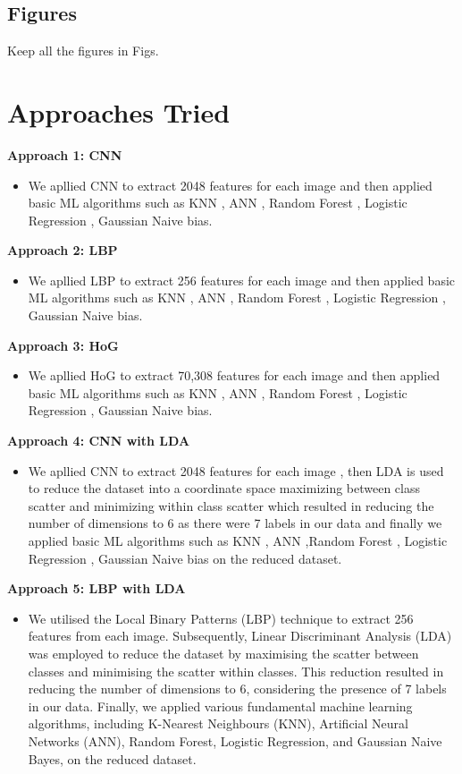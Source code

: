 \documentclass[a4paper]{article}
\theoremstyle{plain}
\theoremstyle{definition}
\begin{document}
	\subsection{Figures}
	Keep all the figures in Figs.
	\newpage
	
	
	\section{Approaches Tried}
	\label{sec:app}
 \textbf{Approach 1: CNN}\vspace{3pt}
 \begin{itemize}
 \item We apllied CNN to extract 2048 features for each image and then applied basic ML algorithms such as KNN , ANN , Random Forest , Logistic Regression , Gaussian Naive bias.
 \end{itemize}
\textbf{Approach 2: LBP}\vspace{3pt}
 \begin{itemize}
 \item We apllied LBP to extract 256 features for each image and then applied basic ML algorithms such as KNN , ANN , Random Forest , Logistic Regression , Gaussian Naive bias.
 \end{itemize}
\textbf{Approach 3: HoG}\vspace{3pt}
 \begin{itemize}
 \item We apllied HoG to extract 70,308 features for each image and then applied basic ML algorithms such as KNN , ANN , Random Forest , Logistic Regression , Gaussian Naive bias.
 \end{itemize}
\textbf{Approach 4: CNN with LDA}\vspace{3pt}
 \begin{itemize}
 \item We apllied CNN to extract 2048 features for each image , then LDA is used to reduce the dataset into a coordinate space maximizing between class scatter and minimizing within class scatter which resulted in reducing the number of dimensions to 6 as there were 7 labels in our data and finally we applied basic ML algorithms such as KNN , ANN ,Random Forest , Logistic Regression , Gaussian Naive bias on the reduced dataset.
 \end{itemize}
\textbf{Approach 5: LBP with LDA}\vspace{3pt}
 \begin{itemize}
 \item We utilised the Local Binary Patterns (LBP) technique to extract 256 features from each image. Subsequently, Linear Discriminant Analysis (LDA) was employed to reduce the dataset by maximising the scatter between classes and minimising the scatter within classes. This reduction resulted in reducing the number of dimensions to 6, considering the presence of 7 labels in our data. Finally, we applied various fundamental machine learning algorithms, including K-Nearest Neighbours (KNN), Artificial Neural Networks (ANN), Random Forest, Logistic Regression, and Gaussian Naive Bayes, on the reduced dataset.
 \end{itemize}
\end{document}
